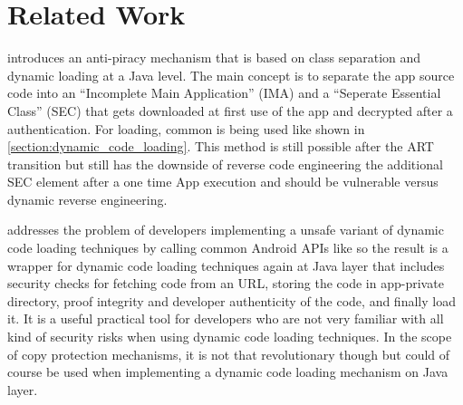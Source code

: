 \chapter{Related Work}\label{chapter:related_workd}
\parencite{anti_piracy} introduces an anti-piracy mechanism that is based on class
separation and dynamic loading at a Java level. The main concept is to separate the app source code into an ``Incomplete Main Application'' (IMA) and a ``Seperate Essential Class'' (SEC) that gets downloaded at first use of the app and decrypted after a authentication. For loading, common  is being used like shown in
\autoref{section:dynamic_code_loading}. This method is still possible after the ART transition but still has the downside of reverse code engineering the additional SEC 
element after a one time App execution and should be vulnerable versus dynamic reverse engineering.

\parencite{grab_n_run} addresses the problem of developers implementing a unsafe variant of dynamic code loading techniques by calling common Android APIs like  so the result is a wrapper for dynamic code loading techniques again at Java layer that includes security checks for fetching code from an URL, storing the code
in app-private directory, proof integrity and developer authenticity of the code, and finally load it. It is a useful practical tool for developers who are not very familiar with all kind of security risks when using dynamic code loading techniques. In the scope
of copy protection mechanisms, it is not that revolutionary though but could of course be used when implementing a dynamic code loading mechanism on Java layer.


